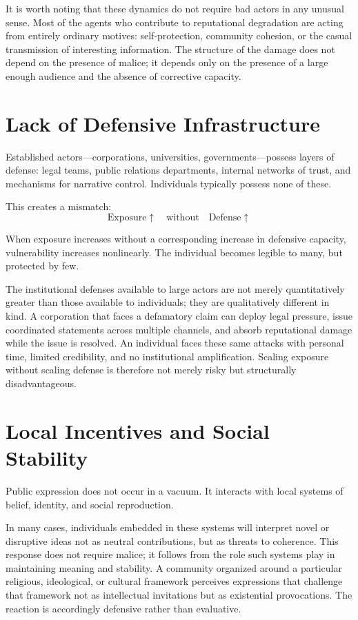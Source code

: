 \documentclass[12pt,a4paper]{article}
\begin{document}
It is worth noting that these dynamics do not require bad actors in any unusual sense. Most of the agents who contribute to reputational degradation are acting from entirely ordinary motives: self-protection, community cohesion, or the casual transmission of interesting information. The structure of the damage does not depend on the presence of malice; it depends only on the presence of a large enough audience and the absence of corrective capacity.


\section{Lack of Defensive Infrastructure}

Established actors---corporations, universities, governments---possess layers of defense: legal teams, public relations departments, internal networks of trust, and mechanisms for narrative control. Individuals typically possess none of these.

This creates a mismatch:
\[
\text{Exposure} \uparrow \quad \text{without} \quad \text{Defense} \uparrow
\]

When exposure increases without a corresponding increase in defensive capacity, vulnerability increases nonlinearly. The individual becomes legible to many, but protected by few.

The institutional defenses available to large actors are not merely quantitatively greater than those available to individuals; they are qualitatively different in kind. A corporation that faces a defamatory claim can deploy legal pressure, issue coordinated statements across multiple channels, and absorb reputational damage while the issue is resolved. An individual faces these same attacks with personal time, limited credibility, and no institutional amplification. Scaling exposure without scaling defense is therefore not merely risky but structurally disadvantageous.

\section{Local Incentives and Social Stability}

Public expression does not occur in a vacuum. It interacts with local systems of belief, identity, and social reproduction.

In many cases, individuals embedded in these systems will interpret novel or disruptive ideas not as neutral contributions, but as threats to coherence. This response does not require malice; it follows from the role such systems play in maintaining meaning and stability. A community organized around a particular religious, ideological, or cultural framework perceives expressions that challenge that framework not as intellectual invitations but as existential provocations. The reaction is accordingly defensive rather than evaluative.
\end{document}
